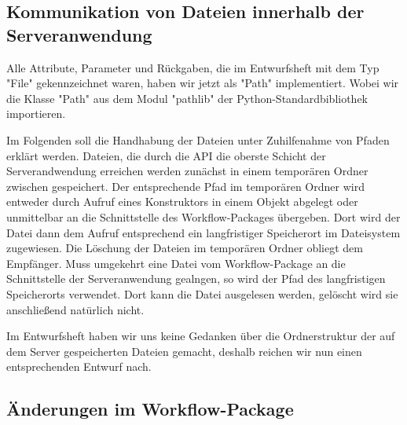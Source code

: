 \subsection{Kommunikation von Dateien innerhalb der Serveranwendung}
Alle Attribute, Parameter und Rückgaben, die im Entwurfsheft mit dem Typ "File" gekennzeichnet waren, haben wir jetzt als "Path" implementiert. Wobei wir die Klasse "Path" aus dem Modul "pathlib" der Python-Standardbibliothek importieren.

Im Folgenden soll die Handhabung der Dateien unter Zuhilfenahme von Pfaden erklärt werden. Dateien, die durch die API die oberste Schicht der Serverandwendung erreichen werden zunächst in einem temporären Ordner zwischen gespeichert. Der entsprechende Pfad im temporären Ordner wird entweder durch Aufruf eines Konstruktors in einem Objekt abgelegt oder unmittelbar an die Schnittstelle des Workflow-Packages übergeben.
Dort wird der Datei dann dem Aufruf entsprechend ein langfristiger Speicherort im Dateisystem zugewiesen. Die Löschung der Dateien im temporären Ordner obliegt dem Empfänger. Muss umgekehrt eine Datei vom Workflow-Package an die Schnittstelle der Serveranwendung gealngen, so wird der Pfad des langfristigen Speicherorts verwendet. Dort kann die Datei ausgelesen werden, gelöscht wird sie anschließend natürlich nicht.

Im Entwurfsheft haben wir uns keine Gedanken über die Ordnerstruktur der auf dem Server gespeicherten Dateien gemacht, deshalb reichen wir nun einen entsprechenden Entwurf nach. 

\subsection{Änderungen im Workflow-Package}